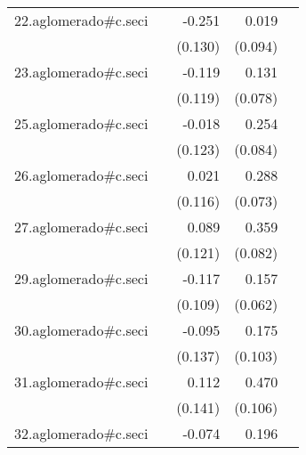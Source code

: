 {\begin{longtable}{l*{4}{D{.}{.}{-1}}}
\addlinespace
22.aglomerado#c.seci&                     &      -0.251         &       0.019         &                     \\
            &                     &     (0.130)         &     (0.094)         &                     \\
\addlinespace
23.aglomerado#c.seci&                     &      -0.119         &       0.131         &                     \\
            &                     &     (0.119)         &     (0.078)         &                     \\
\addlinespace
25.aglomerado#c.seci&                     &      -0.018         &       0.254\sym{**} &                     \\
            &                     &     (0.123)         &     (0.084)         &                     \\
\addlinespace
26.aglomerado#c.seci&                     &       0.021         &       0.288\sym{***}&                     \\
            &                     &     (0.116)         &     (0.073)         &                     \\
\addlinespace
27.aglomerado#c.seci&                     &       0.089         &       0.359\sym{***}&                     \\
            &                     &     (0.121)         &     (0.082)         &                     \\
\addlinespace
29.aglomerado#c.seci&                     &      -0.117         &       0.157\sym{*}  &                     \\
            &                     &     (0.109)         &     (0.062)         &                     \\
\addlinespace
30.aglomerado#c.seci&                     &      -0.095         &       0.175         &                     \\
            &                     &     (0.137)         &     (0.103)         &                     \\
\addlinespace
31.aglomerado#c.seci&                     &       0.112         &       0.470\sym{***}&                     \\
            &                     &     (0.141)         &     (0.106)         &                     \\
\addlinespace
32.aglomerado#c.seci&                     &      -0.074         &       0.196         &                     \\

\end{longtable}}

